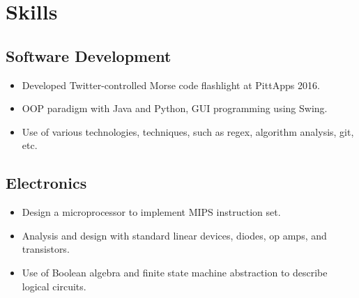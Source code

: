 \documentclass{article}
\begin{document}
%    
  \section*{Skills}
    \subsection*{Software Development}
      \begin{itemize}
      	\item Developed Twitter-controlled Morse code flashlight at PittApps 2016.
        \item OOP paradigm with Java and Python, GUI programming using Swing.
        \item Use of various technologies, techniques, such as regex, algorithm analysis, git, etc.
      \end{itemize}
    \subsection*{Electronics}
      \begin{itemize}
      	\item Design a microprocessor to implement MIPS instruction set.
        \item Analysis and design with standard linear devices, diodes, op amps, and transistors.
        \item Use of Boolean algebra and finite state machine abstraction to describe logical circuits.
        
      \end{itemize}
\end{document}

